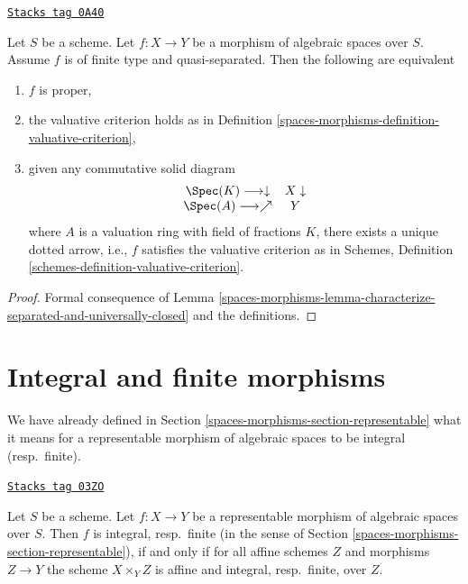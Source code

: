 \begin{lemma}

\label{spaces-morphisms-lemma-characterize-proper}
\href{https://stacks.math.columbia.edu/tag/0A40}{\texttt{Stacks tag 0A40}}

Let $S$ be a scheme. Let $f : X \to Y$ be a morphism of algebraic spaces
over $S$. Assume $f$ is of finite type and quasi-separated. Then the
following are equivalent
\begin{enumerate}
\item $f$ is proper,
\item the valuative criterion holds as in Definition
\ref{spaces-morphisms-definition-valuative-criterion},
\item given any commutative solid diagram
$$
\begin{array}{cc}\Spec(K) \longrightarrow\downarrow & X \downarrow \\ \Spec(A) \longrightarrow\nearrow & Y\end{array}
$$
where $A$ is a valuation ring with field of fractions $K$, there exists
a unique dotted arrow, i.e., $f$ satisfies the valuative
criterion as in
Schemes, Definition \ref{schemes-definition-valuative-criterion}.
\end{enumerate}
\end{lemma}

\begin{proof}
Formal consequence of
Lemma \ref{spaces-morphisms-lemma-characterize-separated-and-universally-closed}
and the definitions.
\end{proof}

\section{Integral and finite morphisms}
\label{spaces-morphisms-section-integral}
We have already defined in Section \ref{spaces-morphisms-section-representable}
what it means for a representable morphism of algebraic spaces
to be integral (resp.\ finite).

\begin{lemma}
\label{spaces-morphisms-lemma-integral-representable}
\href{https://stacks.math.columbia.edu/tag/03ZO}{\texttt{Stacks tag 03ZO}}

Let $S$ be a scheme. Let $f : X \to Y$ be a representable
morphism of algebraic spaces over $S$. Then
$f$ is integral, resp.\ finite
(in the sense of Section \ref{spaces-morphisms-section-representable}),
if and only if for all affine schemes $Z$
and morphisms $Z \to Y$ the scheme $X \times_Y Z$ is affine and
integral, resp.\ finite, over $Z$.
\end{lemma}

